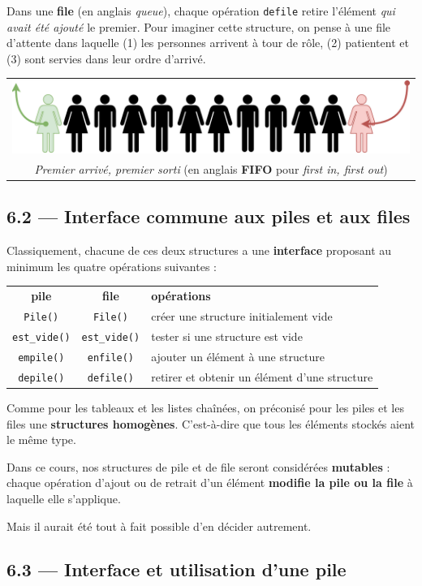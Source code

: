 \documentclass[a4paper,17pt]{extarticle}
\begin{document}
    Dans une \textbf{file} (en anglais \emph{queue}), chaque opération
\texttt{defile} retire l'élément \emph{qui avait été ajouté} le premier.
Pour imaginer cette structure, on pense à une file d'attente dans
laquelle (1) les personnes arrivent à tour de rôle, (2) patientent et
(3) sont servies dans leur ordre d'arrivé.

\begin{longtable}[]{@{}c@{}}
\toprule
\endhead
\includegraphics{img-file.png}\tabularnewline
\emph{Premier arrivé, premier sorti} (en anglais \textbf{FIFO} pour
\emph{first in, first out})\tabularnewline
\bottomrule
\end{longtable}

    \hypertarget{interface-commune-aux-piles-et-aux-files}{%
\subsection{6.2 --- Interface commune aux piles et aux
files}\label{interface-commune-aux-piles-et-aux-files}}

    Classiquement, chacune de ces deux structures a une \textbf{interface}
proposant au minimum les quatre opérations suivantes :

\begin{longtable}[]{@{}ccl@{}}
\toprule
\endhead
\textbf{pile} & \textbf{file} & \textbf{opérations}\tabularnewline
\texttt{Pile()} & \texttt{File()} & créer une structure initialement
vide\tabularnewline
\texttt{est\_vide()} & \texttt{est\_vide()} & tester si une structure
est vide\tabularnewline
\texttt{empile()} & \texttt{enfile()} & ajouter un élément à une
structure\tabularnewline
\texttt{depile()} & \texttt{defile()} & retirer et obtenir un élément
d'une structure\tabularnewline
\bottomrule
\end{longtable}
\begin{remarque}
    Comme pour les tableaux et les listes chaînées, on préconisé pour les
piles et les files une \textbf{structures homogènes}. C'est-à-dire que
tous les éléments stockés aient le même type.

        \end{remarque}\begin{remarque}
    Dans ce cours, nos structures de pile et de file seront considérées
\textbf{mutables} : chaque opération d'ajout ou de retrait d'un élément
\textbf{modifie la pile ou la file} à laquelle elle s'applique.

Mais il aurait été tout à fait possible d'en décider autrement.

        \end{remarque}
    \hypertarget{interface-et-utilisation-dune-pile}{%
\subsection{6.3 --- Interface et utilisation d'une
pile}\label{interface-et-utilisation-dune-pile}}
\end{document}
